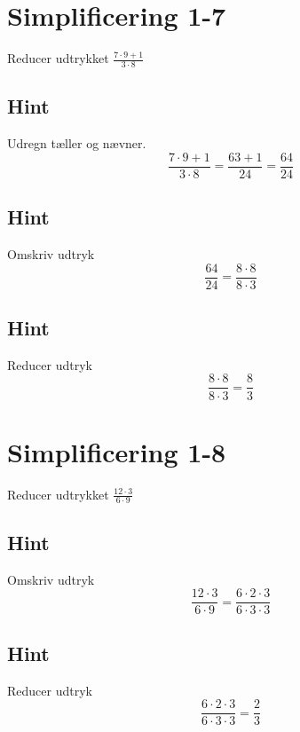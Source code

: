 \documentclass{article}
\newenvironment{exercise}[1]{\newpage\section{#1}}{}
\newcommand{\answerbox}[1]{\fbox{$#1$}}
\newcommand{\hint}{\subsection*{Hint}}
\begin{document}
\newpage

\begin{exercise}{Simplificering 1-7}
	
	Reducer udtrykket $\frac{7 \cdot 9 + 1}{3 \cdot 8}$
	
	\answerbox{\frac{8}{3}}
	
	\hint
	
	Udregn tæller og nævner.
	\[
	\frac{7 \cdot 9 + 1}{3 \cdot 8} = \frac{63+1}{24} = \frac{64}{24}
	\]
	
	\hint

	Omskriv udtryk 
	\[
	\frac{64}{24} = \frac{8 \cdot 8}{8 \cdot 3}
	\]	
	
	\hint
	
	Reducer udtryk 
	\[
	\frac{8 \cdot 8}{8 \cdot 3} = \frac{8}{3}
	\]
	
\end{exercise}

\newpage

\begin{exercise}{Simplificering 1-8}
	
	Reducer udtrykket $\frac{12 \cdot 3}{6 \cdot 9}$

	\answerbox{\frac{2}{3}}

	\hint

	Omskriv udtryk
	\[
	\frac{12 \cdot 3}{6 \cdot 9} = \frac{6 \cdot 2 \cdot 3}{ 6 \cdot 3 \cdot 3}
	\]
	
	\hint

	Reducer udtryk 
	\[
	 \frac{6 \cdot 2 \cdot 3}{6 \cdot 3 \cdot 3} = \frac{2}{3} 
	\]
	
\end{exercise}
\end{document}
